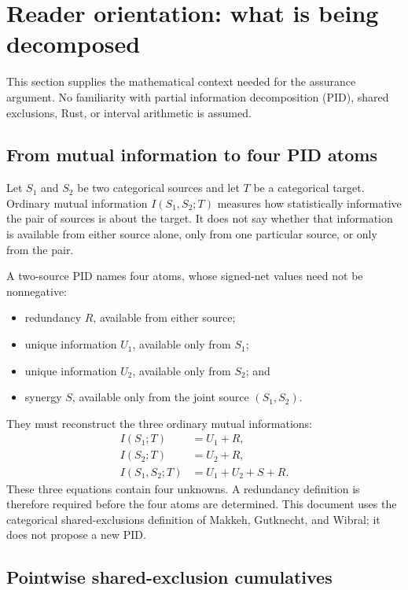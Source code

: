 \documentclass[11pt]{article}
\theoremstyle{definition}
\begin{document}
\begingroup
\small
\setlength{\parskip}{0pt}
\tableofcontents
\endgroup

\section{Reader orientation: what is being decomposed}

This section supplies the mathematical context needed for the assurance argument.  No familiarity
with partial information decomposition (PID), shared exclusions, Rust, or interval arithmetic is
assumed.

\subsection{From mutual information to four PID atoms}

Let $S_1$ and $S_2$ be two categorical sources and let $T$ be a categorical target.  Ordinary
mutual information $I(S_1,S_2;T)$ measures how statistically informative the pair of sources is
about the target.  It does not say whether that information is available from either source
alone, only from one particular source, or only from the pair.

A two-source PID names four atoms, whose signed-net values need not be nonnegative:
\begin{itemize}[leftmargin=*]
  \item redundancy $R$, available from either source;
  \item unique information $U_1$, available only from $S_1$;
  \item unique information $U_2$, available only from $S_2$; and
  \item synergy $S$, available only from the joint source $(S_1,S_2)$.
\end{itemize}
They must reconstruct the three ordinary mutual informations:
\begin{align}
  I(S_1;T)&=U_1+R,\label{eq:pid-mi-one}\\
  I(S_2;T)&=U_2+R,\label{eq:pid-mi-two}\\
  I(S_1,S_2;T)&=U_1+U_2+S+R.\label{eq:pid-mi-joint}
\end{align}
These three equations contain four unknowns.  A redundancy definition is therefore required before
the four atoms are determined.  This document uses the categorical shared-exclusions definition
of Makkeh, Gutknecht, and Wibral; it does not propose a new PID.

\subsection{Pointwise shared-exclusion cumulatives}
\end{document}
